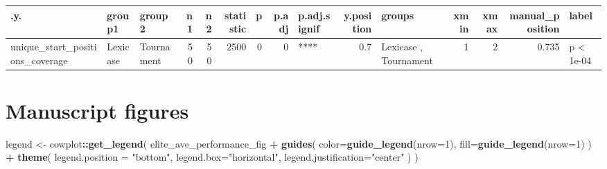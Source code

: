 \documentclass[]{book}
\newenvironment{Shaded}{\begin{snugshade}}{\end{snugshade}}
\newcommand{\DataTypeTok}[1]{\textcolor[rgb]{0.13,0.29,0.53}{#1}}
\newcommand{\DecValTok}[1]{\textcolor[rgb]{0.00,0.00,0.81}{#1}}
\newcommand{\KeywordTok}[1]{\textcolor[rgb]{0.13,0.29,0.53}{\textbf{#1}}}
\newcommand{\NormalTok}[1]{#1}
\newcommand{\OperatorTok}[1]{\textcolor[rgb]{0.81,0.36,0.00}{\textbf{#1}}}
\newcommand{\StringTok}[1]{\textcolor[rgb]{0.31,0.60,0.02}{#1}}
\begin{document}
\begin{tabular}{l|l|l|r|r|r|r|r|l|r|l|r|r|r|l}
\hline
.y. & group1 & group2 & n1 & n2 & statistic & p & p.adj & p.adj.signif & y.position & groups & xmin & xmax & manual\_position & label\\
\hline
unique\_start\_positions\_coverage & Lexicase & Tournament & 50 & 50 & 2500 & 0 & 0 & **** & 0.7 & Lexicase  , Tournament & 1 & 2 & 0.735 & p < 1e-04\\
\hline
\end{tabular}

\hypertarget{manuscript-figures}{%
\section{Manuscript figures}\label{manuscript-figures}}

\begin{Shaded}
\begin{Highlighting}[]
\NormalTok{legend <-}\StringTok{ }\NormalTok{cowplot}\OperatorTok{::}\KeywordTok{get_legend}\NormalTok{(}
\NormalTok{    elite_ave_performance_fig }\OperatorTok{+}
\StringTok{      }\KeywordTok{guides}\NormalTok{(}
        \DataTypeTok{color=}\KeywordTok{guide_legend}\NormalTok{(}\DataTypeTok{nrow=}\DecValTok{1}\NormalTok{),}
        \DataTypeTok{fill=}\KeywordTok{guide_legend}\NormalTok{(}\DataTypeTok{nrow=}\DecValTok{1}\NormalTok{)}
\NormalTok{      ) }\OperatorTok{+}
\StringTok{      }\KeywordTok{theme}\NormalTok{(}
        \DataTypeTok{legend.position =} \StringTok{"bottom"}\NormalTok{,}
        \DataTypeTok{legend.box=}\StringTok{"horizontal"}\NormalTok{,}
        \DataTypeTok{legend.justification=}\StringTok{"center"}
\NormalTok{      )}
\NormalTok{  )}


\end{Highlighting}
\end{Shaded}
\end{document}
